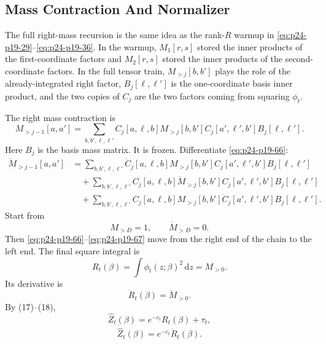 \documentclass[11pt]{article}
\numberwithin{equation}{section}
\newcommand{\dd}{\,\mathrm d}
\begin{document}
\subsection{Mass Contraction And Normalizer}

The full right-mass recursion is the same idea as the rank-\(R\) warmup in
\eqref{eq:p24-p19-29}--\eqref{eq:p24-p19-36}.  In the warmup, \(M_1[r,s]\) stored the inner products of the
first-coordinate factors and \(M_2[r,s]\) stored the inner products of the
second-coordinate factors.  In the full tensor train, \(M_{>j}[b,b']\) plays
the role of the already-integrated right factor, \(B_j[\ell,\ell']\) is the
one-coordinate basis inner product, and the two copies of \(C_j\) are the two
factors coming from squaring \(\phi_t\).

The right mass contraction is
\begin{equation}
    M_{>j-1}[a,a']
    =
    \sum_{b,b',\ell,\ell'}
    C_j[a,\ell,b]
    M_{>j}[b,b']
    C_j[a',\ell',b']
    B_j[\ell,\ell'].
    \label{eq:p24-p19-66}
\end{equation}
Here \(B_j\) is the basis mass matrix.  It is frozen.  Differentiate \eqref{eq:p24-p19-66}:
\begin{equation}
\begin{aligned}
    \dot M_{>j-1}[a,a']
    &=
    \sum_{b,b',\ell,\ell'}
    \dot C_j[a,\ell,b]
    M_{>j}[b,b']
    C_j[a',\ell',b']
    B_j[\ell,\ell']\\
    &\quad+
    \sum_{b,b',\ell,\ell'}
    C_j[a,\ell,b]
    \dot M_{>j}[b,b']
    C_j[a',\ell',b']
    B_j[\ell,\ell']\\
    &\quad+
    \sum_{b,b',\ell,\ell'}
    C_j[a,\ell,b]
    M_{>j}[b,b']
    \dot C_j[a',\ell',b']
    B_j[\ell,\ell'].
\end{aligned}
\label{eq:p24-p19-67}
\end{equation}
Start from
\begin{equation}
    M_{>D}=1,
    \qquad
    \dot M_{>D}=0.
    \label{eq:p24-p19-68}
\end{equation}
Then \eqref{eq:p24-p19-66}--\eqref{eq:p24-p19-67} move from the right end of the chain to the left end.  The
final square integral is
\begin{equation}
    R_t(\beta)=\int\phi_t(z;\beta)^2\dd z=M_{>0}.
    \label{eq:p24-p19-69}
\end{equation}
Its derivative is
\begin{equation}
    \dot R_t(\beta)=\dot M_{>0}.
    \label{eq:p24-p19-70}
\end{equation}
By (17)--(18),
\begin{equation}
    \widehat Z_t(\beta)=e^{-c_t}R_t(\beta)+\tau_t,
    \label{eq:p24-p19-71}
\end{equation}
\begin{equation}
    \dot{\widehat Z}_t(\beta)=e^{-c_t}\dot R_t(\beta).
    \label{eq:p24-p19-72}
\end{equation}
\end{document}
